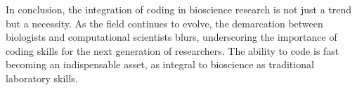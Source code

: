 In conclusion, the integration of coding in bioscience research is not just a
trend but a necessity. As the field continues to evolve, the demarcation between
biologists and computational scientists blurs, underscoring the importance of
coding skills for the next generation of researchers. The ability to code is
fast becoming an indispensable asset, as integral to bioscience as traditional
laboratory skills.











